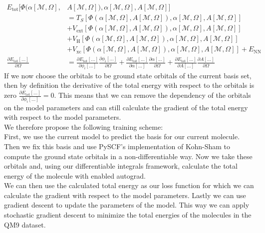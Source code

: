 \begin{align}
    E_{\text{tot}}[\Phi(\alpha[\mathcal{M},\Omega],&A[\mathcal{M},\Omega]),\alpha[\mathcal{M},\Omega],A[\mathcal{M},\Omega]] \\
    &= T_S[\Phi(\alpha[\mathcal{M},\Omega],A[\mathcal{M},\Omega]),\alpha[\mathcal{M},\Omega],A[\mathcal{M},\Omega]] \nonumber\\
    &+ V_{\text{ext}}[\Phi(\alpha[\mathcal{M},\Omega],A[\mathcal{M},\Omega]),\alpha[\mathcal{M},\Omega],A[\mathcal{M},\Omega]] \nonumber\\
    &+ V_{\text{H}}[\Phi(\alpha[\mathcal{M},\Omega],A[\mathcal{M},\Omega]),\alpha[\mathcal{M},\Omega],A[\mathcal{M},\Omega]] \nonumber\\
    &+ V_{\text{xc}}[\Phi(\alpha[\mathcal{M},\Omega],A[\mathcal{M},\Omega]),\alpha[\mathcal{M},\Omega],A[\mathcal{M},\Omega]] + E_{\text{NN}}\nonumber\\
        \frac{\partial E_{\text{tot}}[...]}{\partial \Omega}
    &= \frac{\partial E_{\text{tot}}[...]}{\partial \phi_i[...]}\frac{\partial \phi_i[...]}{\partial \Omega} + \frac{\partial E_{\text{tot}}[...]}{\partial \alpha[...]}\frac{\partial \alpha[...]}{\partial \Omega} + \frac{\partial E_{\text{tot}}[...]}{\partial A[...]}\frac{\partial A[...]}{\partial \Omega}
\end{align}
If we now choose the orbitals to be ground state orbitals of the current basis set, then by definition the derivative of the total energy with respect to the orbitals is zero $\frac{\partial E_{\text{tot}}[...]}{\partial \phi_i[...]}=0$.
This means that we can remove the dependency of the orbitals on the model parameters and can still calculate the gradient of the total energy with respect to the model parameters. \\
We therefore propose the following training scheme: \\
First, we use the current model to predict the basis for our current molecule.
Then we fix this basis and use PySCF's\cite{sun2020recent} implementation of Kohn-Sham to compute the ground state orbitals in a non-differentiable way.
Now we take these orbitals and, using our differentiable integrals framework, calculate the total energy of the molecule with enabled autograd.\\
We can then use the calculated total energy as our loss function for which we can calculate the gradient with respect to the model parameters.
Lastly we can use gradient descent to update the parameters of the model.
This way we can apply stochastic gradient descent to minimize the total energies of the molecules in the QM9 dataset.\\


